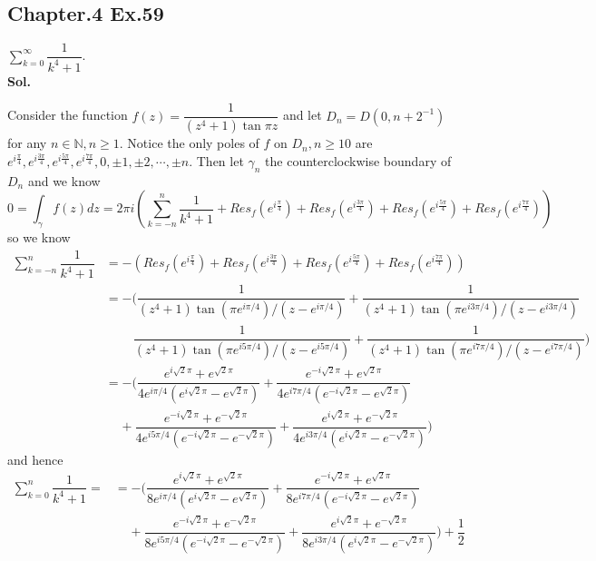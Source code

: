 \documentclass[lang=en,11pt,a4paper,citestyle =authoryear]{elegantpaper}
\newcommand{\N}{\mathbb{N}}
\begin{document}
\subsection*{Chapter.4 Ex.59} 
$\sum\limits_{k=0}^{\infty} \dfrac{1}{k^4+1}$.
\vspace{0.5em}\\
\textbf{Sol.} \par
Consider the function $f(z) = \dfrac{1}{(z^4+1)\tan \pi z}$ and let $D_n = D(0,n+2^{-1})$ for any $n\in\N, n \geq 1$. Notice the only poles of $f$ on $D_n, n\geq 10$ are $e^{i\tfrac{\pi}{4}},e^{i\tfrac{3\pi}{4}},e^{i\tfrac{5\pi}{4}},e^{i\tfrac{7\pi}{4}}, 0 , \pm 1,\pm 2,\cdots, \pm n$. Then let $\gamma_n$ the counterclockwise boundary of $D_n$ and we know
\[
0 = \int_{\gamma}f(z)dz = 2\pi i (\sum\limits_{k = -n}^n \dfrac{1}{k^4+1} + Res_f(e^{i\tfrac{\pi}{4}})+Res_f(e^{i\tfrac{3\pi}{4}})+Res_f(e^{i\tfrac{5\pi}{4}})+Res_f(e^{i\tfrac{7\pi}{4}}))
\]
so we know
\[
\begin{aligned}
\sum\limits_{k = -n}^n \dfrac{1}{k^4+1} &= -(Res_f(e^{i\tfrac{\pi}{4}})+Res_f(e^{i\tfrac{3\pi}{4}})+Res_f(e^{i\tfrac{5\pi}{4}})+Res_f(e^{i\tfrac{7\pi}{4}})) \\&= -\Big(\dfrac{1}{(z^4+1)\tan(\pi e^{i\pi/4})/(z-e^{i\pi/4})} + \dfrac{1}{(z^4+1)\tan(\pi e^{i3\pi/4})/(z-e^{i3\pi/4})} \\ &\ \ \ \ \ \ \ \ \ \ \dfrac{1}{(z^4+1)\tan(\pi e^{i5\pi/4})/(z-e^{i5\pi/4})} + \dfrac{1}{(z^4+1)\tan(\pi e^{i7\pi/4})/(z-e^{i7\pi/4})}\Big) \\
&= -\Big(\dfrac{e^{i\sqrt{2}\pi}+e^{\sqrt{2}\pi}}{4e^{i\pi/4}(e^{i\sqrt{2}\pi}-e^{\sqrt{2}\pi})} + \dfrac{e^{-i\sqrt{2}\pi}+e^{\sqrt{2}\pi}}{4e^{i7\pi/4}(e^{-i\sqrt{2}\pi}-e^{\sqrt{2}\pi})}\\ &\ \ \ \ \ +\dfrac{e^{-i\sqrt{2}\pi}+e^{-\sqrt{2}\pi}}{4e^{i5\pi/4}(e^{-i\sqrt{2}\pi}-e^{-\sqrt{2}\pi})}+\dfrac{e^{i\sqrt{2}\pi}+e^{-\sqrt{2}\pi}}{4e^{i3\pi/4}(e^{i\sqrt{2}\pi}-e^{-\sqrt{2}\pi})}\Big)
\end{aligned}
\]
and hence
\[
\begin{aligned}
\sum\limits_{k = 0}^n \dfrac{1}{k^4+1} = &= -\Big(\dfrac{e^{i\sqrt{2}\pi}+e^{\sqrt{2}\pi}}{8e^{i\pi/4}(e^{i\sqrt{2}\pi}-e^{\sqrt{2}\pi})} + \dfrac{e^{-i\sqrt{2}\pi}+e^{\sqrt{2}\pi}}{8e^{i7\pi/4}(e^{-i\sqrt{2}\pi}-e^{\sqrt{2}\pi})}\\ &\ \ \ \ \ +\dfrac{e^{-i\sqrt{2}\pi}+e^{-\sqrt{2}\pi}}{8e^{i5\pi/4}(e^{-i\sqrt{2}\pi}-e^{-\sqrt{2}\pi})}+\dfrac{e^{i\sqrt{2}\pi}+e^{-\sqrt{2}\pi}}{8e^{i3\pi/4}(e^{i\sqrt{2}\pi}-e^{-\sqrt{2}\pi})}\Big)+\dfrac{1}{2}
\end{aligned}
\]
\vspace{0.5em}
\end{document}
